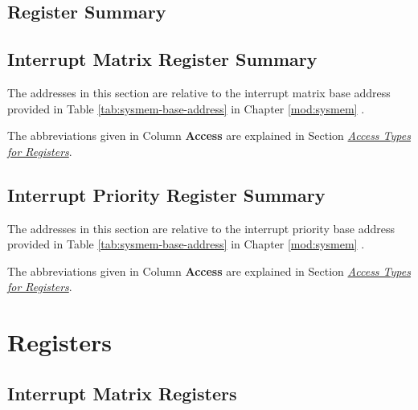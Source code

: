 \documentclass[main\_\_EN.tex]{subfiles}
\begin{document}

\clearpage
\hypertarget{intmtrx-reg-summ}{}
\begin{landscape}
\section{Register Summary}

\subsection{Interrupt Matrix Register Summary}
\label{sec:intmtrx-reg-summ}
The addresses in this section are relative to the interrupt matrix base address provided in Table \ref{tab:sysmem-base-address} in Chapter \ref{mod:sysmem} \textit{}.

The abbreviations given in Column \textbf{Access} are explained in Section \hyperref[glossary-access-types]{\textit{Access Types for Registers}}.



\subsection{Interrupt Priority Register Summary}
\label{sec:intpri-reg-summ}
The addresses in this section are relative to the interrupt priority base address provided in Table \ref{tab:sysmem-base-address} in Chapter \ref{mod:sysmem} \textit{}.

The abbreviations given in Column \textbf{Access} are explained in Section \hyperref[glossary-access-types]{\textit{Access Types for Registers}}.



\end{landscape}



\clearpage
\section{Registers}

\subsection{Interrupt Matrix Registers}
\end{document}

